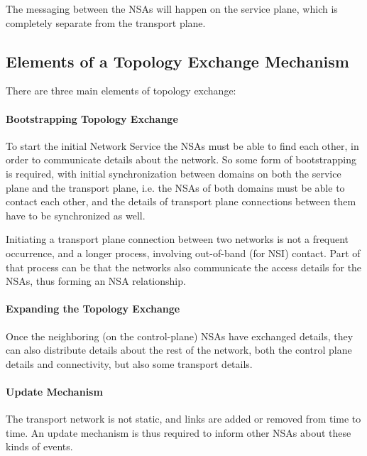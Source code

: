 \documentclass[12pt]{article}  %
\begin{document}
The messaging between the NSAs will happen on the 
service plane, which is completely separate from the transport plane.\label{h.dc66uw3zo12t}\label{h.ywjdj9kuwkou}


\subsection{Elements of a Topology Exchange Mechanism}

 There are three main elements of topology exchange: \label{h.u0b214m8krs}


\paragraph{Bootstrapping Topology Exchange}

 To start the initial Network Service the NSAs must be able to 
find each other, in order to communicate details about the network. So some form 
of bootstrapping is required, with initial synchronization between domains on both 
the service plane and the transport plane, i.e. the NSAs of both domains must be 
able to contact each other, and the details of transport plane connections between 
them have to be synchronized as well.\label{h.fzohc79rts8y}


Initiating a transport plane connection between two 
networks is not a frequent occurrence, and a longer process, involving out-of-band 
(for NSI) contact. Part of that process can be that the networks also communicate 
the access details for the NSAs, thus forming an NSA relationship.\label{h.30v92h80y7jj}


\paragraph{Expanding the Topology Exchange}

 Once the neighboring (on the control-plane) NSAs have exchanged 
details, they can also distribute details about the rest of the network, both the 
control plane details and connectivity, but also some transport details.\label{h.c1dz1g10oju}

\paragraph{Update Mechanism}

 The transport network is not static, and links are added or removed 
from time to time. An update mechanism is thus required to inform other NSAs about 
these kinds of events.\label{h.uzmy62lgeii3}
\end{document}
